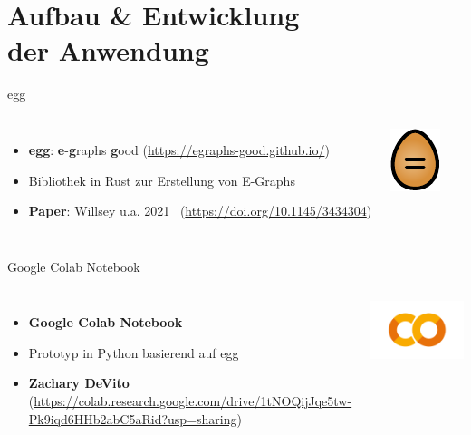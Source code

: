 \EnableTitleSlide
\section{Aufbau \& Entwicklung \\ der Anwendung}

\begin{frame}{egg}
    \begin{columns}[c]
            \begin{itemize}
                \item \textbf{egg}: \textbf{e}-\textbf{g}raphs \textbf{g}ood (\url{https://egraphs-good.github.io/})
                \item Bibliothek in Rust zur Erstellung von E-Graphs
                \item \textbf{Paper}: Willsey u.a. 2021~\cite{2021-egg} (\url{https://doi.org/10.1145/3434304})
            \end{itemize}\hspace{2.5cm}
            \includegraphics[scale=1.9]{utils/egg.pdf}
    \end{columns}
\end{frame}

\begin{frame}{Google Colab Notebook}
    \begin{columns}[c]
            \begin{itemize}
                \item \textbf{Google Colab Notebook}
                \item Prototyp in Python basierend auf egg
                \item \textbf{Zachary DeVito}~\cite{devito} (\url{https://colab.research.google.com/drive/1tNOQijJqe5tw-Pk9iqd6HHb2abC5aRid?usp=sharing})
            \end{itemize}\hspace{-2.5cm}
            \includegraphics[scale=0.15]{utils/colab.png}
    \end{columns}
\end{frame}

